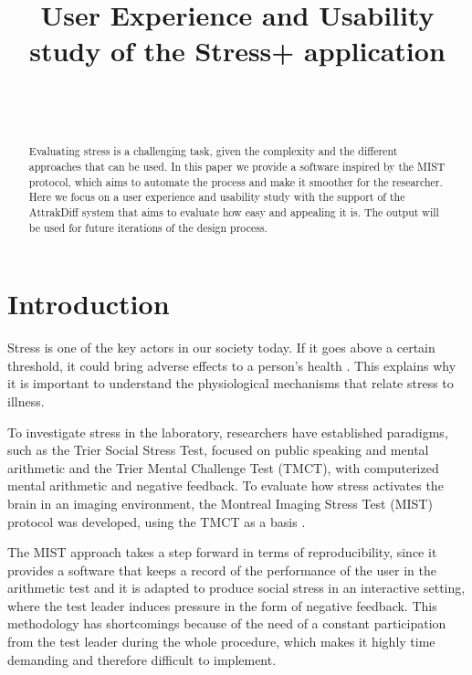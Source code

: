 \documentclass[conference]{IEEEtran}
\date{}
\title{User Experience and Usability study of the Stress+ application}
\begin{document}
\author{\\
\\}

\maketitle

\begin{abstract}
Evaluating stress is a challenging task, given the complexity and the different
approaches that can be used. In this paper we provide a software inspired by the
MIST protocol, which aims to automate the process and make it smoother for the
researcher. Here we focus on a user experience and usability study with the
support of the AttrakDiff system that aims to evaluate how easy and appealing it
is. The output will be used for future iterations of the design process.
\end{abstract}

\section{Introduction}
\label{sec:org0d6fb1c}
Stress is one of the key actors in our society today. If it goes above a certain
threshold, it could bring adverse effects to a person's health
\cite{mcewen_stress_1998}. This explains why it is important to understand the
physiological mechanisms that relate stress to illness.


To investigate stress in the laboratory, researchers have established paradigms,
such as the Trier Social Stress Test, focused on public speaking and mental
arithmetic and the Trier Mental Challenge Test (TMCT), with computerized mental
arithmetic and negative feedback. To evaluate how stress activates the brain in
an imaging environment, the Montreal Imaging Stress Test (MIST) protocol was
developed, using the TMCT as a basis \cite{dedovic_montreal_2005}.

The MIST approach takes a step forward in terms of reproducibility, since it
provides a software that keeps a record of the performance of the user in the
arithmetic test and it is adapted to produce social stress in an interactive
setting, where the test leader induces pressure in the form of negative
feedback. This methodology has shortcomings because of the need of a constant
participation from the test leader during the whole procedure, which makes it
highly time demanding and therefore difficult to implement.
\end{document}
